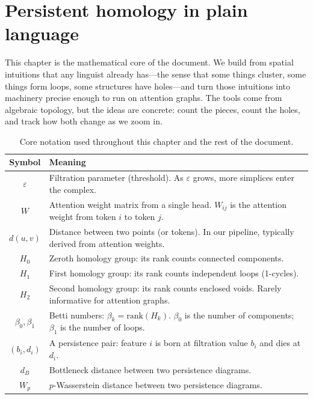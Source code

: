 \chapter{Persistent homology in plain language}
\label{ch:persistent-homology}

This chapter is the mathematical core of the document.
We build from spatial intuitions that any linguist already has---the sense
that some things cluster, some things form loops, some structures have
holes---and turn those intuitions into machinery precise enough to run
on attention graphs.
The tools come from algebraic topology, but the ideas are
concrete: count the pieces, count the holes, and track how both change
as we zoom in.

\bigskip

\begin{table}[ht]
\centering
\caption{Core notation used throughout this chapter and the rest of the document.}
\label{tab:notation}
\begin{tabular}{c p{10cm}}
\hline
\textbf{Symbol} & \textbf{Meaning} \\
\hline
$\varepsilon$ & Filtration parameter (threshold). As $\varepsilon$ grows, more simplices enter the complex. \\
$W$ & Attention weight matrix from a single head. $W_{ij}$ is the attention weight from token $i$ to token $j$. \\
$d(u,v)$ & Distance between two points (or tokens). In our pipeline, typically derived from attention weights. \\
$H_0$ & Zeroth homology group: its rank counts connected components. \\
$H_1$ & First homology group: its rank counts independent loops (1-cycles). \\
$H_2$ & Second homology group: its rank counts enclosed voids. Rarely informative for attention graphs. \\
$\beta_0, \beta_1$ & Betti numbers: $\beta_k = \mathrm{rank}(H_k)$. $\beta_0$ is the number of components; $\beta_1$ is the number of loops. \\
$(b_i, d_i)$ & A persistence pair: feature $i$ is born at filtration value $b_i$ and dies at $d_i$. \\
$d_B$ & Bottleneck distance between two persistence diagrams. \\
$W_p$ & $p$-Wasserstein distance between two persistence diagrams. \\
\hline
\end{tabular}
\end{table}

